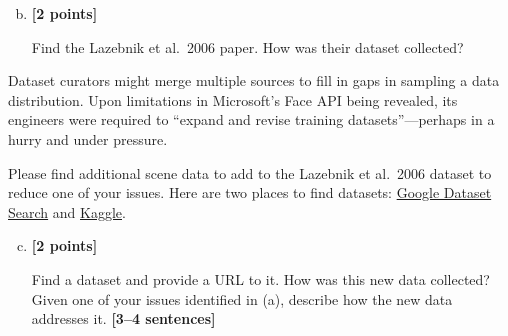 \begin{enumerate}[(a)]
    \setcounter{enumi}{1}
    \item \textbf{[2 points]}
    \begin{tcolorbox}[colback=orange!5!white,colframe=orange!75!black]
        Find the Lazebnik et al.~2006 paper. How was their dataset collected?
    \end{tcolorbox}

\end{enumerate}

\pagebreak
Dataset curators might merge multiple sources to fill in gaps in sampling a data distribution. Upon limitations in Microsoft's Face API being revealed, its engineers were required to ``expand and revise training datasets''---perhaps in a hurry and under pressure. 

Please find additional scene data to add to the Lazebnik et al.~2006 dataset to reduce one of your issues. Here are two places to find datasets: \href{https://datasetsearch.research.google.com}{Google Dataset Search} and \href{https://www.kaggle.com}{Kaggle}. 

\begin{enumerate}[(a)]
    \setcounter{enumi}{2}
    \item \textbf{[2 points]}
    \begin{tcolorbox}[colback=orange!5!white,colframe=orange!75!black]
     
    Find a dataset and provide a URL to it. How was this new data collected? 
    Given one of your issues identified in (a), describe how the new data addresses it. \textbf{[3--4 sentences]}
    \end{tcolorbox}

\end{enumerate}

